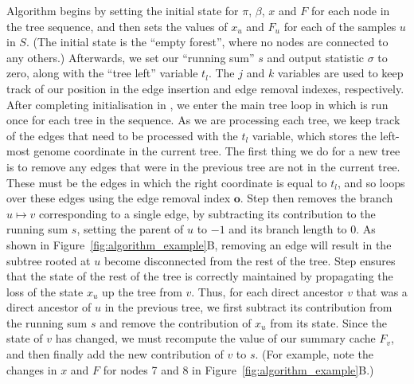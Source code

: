 \documentclass{article}
\newcommand{\indexout}[0]{\ensuremath{\mathbf{o}}}
\begin{document}
Algorithm  begins by setting the initial state for $\pi$, $\beta$,
$x$ and $F$ for each node in the tree sequence, and then sets the values
of $x_u$ and $F_u$ for each of the samples $u$ in $S$.
(The initial state is the ``empty forest'', where no nodes are connected to any others.)
Afterwards, we set our ``running sum'' $s$ and output statistic $\sigma$ to zero, along
with the ``tree left'' variable $t_l$. The $j$ and $k$ variables are
used to keep track of our position in the edge insertion and edge
removal indexes, respectively. After completing initialisation in
, we enter the main tree loop in  which is
run once for each tree in the sequence. As we are processing each
tree, we keep track of the edges that need to be processed with
the $t_l$ variable, which stores the left-most genome coordinate
in the current tree. The first thing we do for a new tree is to
remove any edges that were in the previous tree are not in the
current tree. These must be the edges in which the right coordinate
is equal to $t_l$, and so  loops over these edges using
the edge removal index $\indexout$. Step  then removes
the branch $u \mapsto v$ corresponding to a single edge, by
subtracting its contribution to the running sum $s$, setting the parent of
$u$ to $-1$ and its branch length to $0$. As shown in
Figure~\ref{fig:algorithm_example}B, removing an edge will result
in the subtree rooted at $u$ become disconnected from the rest of the
tree. Step  ensures that the state of the rest of the tree
is correctly maintained by propagating the loss of the state $x_u$
up the tree from $v$. Thus, for each direct ancestor $v$ that was a
direct ancestor of $u$ in the previous tree, we first subtract
its contribution from the running sum $s$ and remove the contribution
of $x_u$ from its state. Since the state of $v$ has changed, we must
recompute the value of our summary cache $F_v$, and then finally
add the new contribution of $v$ to $s$. (For example, note the changes in $x$
and $F$ for nodes 7 and 8 in Figure~\ref{fig:algorithm_example}B.)
\end{document}
